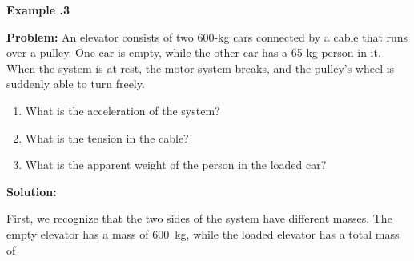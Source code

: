		\begin{mdframed}[backgroundcolor=blue!10!white]
			\begin{center}
				\textbf{Example \thesection.3}
			\end{center}
			
			\textbf{Problem: } An elevator consists of two 600-kg cars connected by a cable that runs over a pulley. One car is empty, while the other car has a 65-kg person in it. When the system is at rest, the motor system breaks, and the pulley's wheel is suddenly able to turn freely.
			
			\begin{enumerate}
				\item What is the acceleration of the system?
				\item What is the tension in the cable?
				\item What is the apparent weight of the person in the loaded car?
			\end{enumerate}
			
			\begin{center}
			\end{center}
			
			\textbf{Solution:}
			
			First, we recognize that the two sides of the system have different masses. The empty elevator has a mass of \SI{600}{kg}, while the loaded elevator has a total mass of
			

\end{mdframed}
